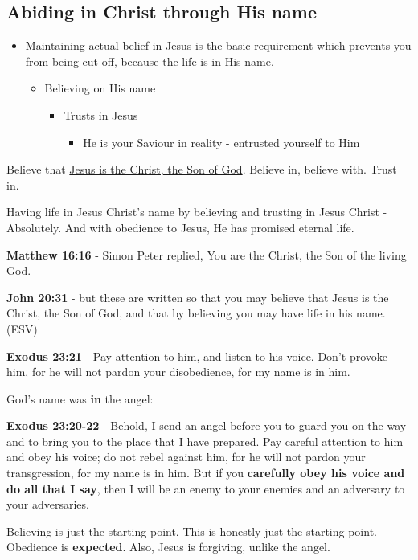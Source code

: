 \documentclass[11pt]{article}
\begin{document}
\subsection{Abiding in Christ through His name}
\label{sec:org713b22d}
\begin{itemize}
\item Maintaining actual belief in Jesus is the basic requirement which prevents you from being cut off, because the life is in His name.
\begin{itemize}
\item Believing on His name
\begin{itemize}
\item Trusts in Jesus
\begin{itemize}
\item He is your Saviour in reality - entrusted yourself to Him
\end{itemize}
\end{itemize}
\end{itemize}
\end{itemize}

Believe that \uline{Jesus is the Christ, the Son of God}. Believe in, believe with. Trust in.

Having life in Jesus Christ's name by believing and trusting in Jesus Christ - Absolutely.
And with obedience to Jesus, He has promised eternal life.

\textbf{Matthew 16:16} - Simon Peter replied, You are the Christ, the Son of the living God.

\textbf{John 20:31} - but these are written so that you may believe that Jesus is the Christ, the Son of God, and that by believing you may have life in his name. (ESV)

\textbf{Exodus 23:21} - Pay attention to him, and listen to his voice. Don't provoke him, for he will not pardon your disobedience, for my name is in him.

God's name was \textbf{in} the angel:

\textbf{Exodus 23:20-22} - Behold, I send an angel before you to guard you on the way and to bring you to the place that I have prepared. Pay careful attention to him and obey his voice; do not rebel against him, for he will not pardon your transgression, for my name is in him. But if you \textbf{carefully obey his voice and do all that I say}, then I will be an enemy to your enemies and an adversary to your adversaries.

Believing is just the starting point. This is honestly just the starting point. Obedience is \textbf{expected}. Also, Jesus is forgiving, unlike the angel.
\end{document}
